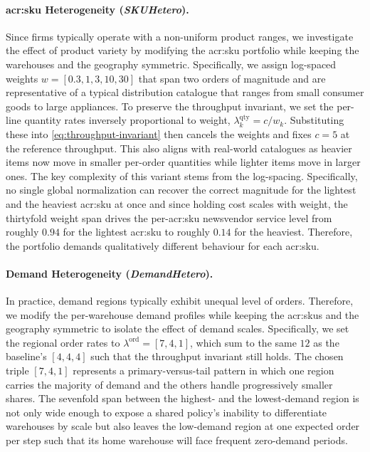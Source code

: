 \paragraph{\textbf{\gls{acr:sku} Heterogeneity} (\textit{SKUHetero}).} Since firms typically operate with a non-uniform product ranges, we investigate the effect of product variety by modifying the \gls{acr:sku} portfolio while keeping the warehouses and the geography symmetric. Specifically, we assign log-spaced weights $w=[0.3,1,3,10,30]$ that span two orders of magnitude and are representative of a typical distribution catalogue that ranges from small consumer goods to large appliances. To preserve the throughput invariant, we set the per-line quantity rates inversely proportional to weight, $\lambda^{\mathrm{qty}}_k=c/w_k$. Substituting these into \autoref{eq:throughput-invariant} then cancels the weights and fixes $c=5$ at the reference throughput. This also aligns with real-world catalogues as heavier items now move in smaller per-order quantities while lighter items move in larger ones. The key complexity of this variant stems from the log-spacing. Specifically, no single global normalization can recover the correct magnitude for the lightest and the heaviest \gls{acr:sku} at once and since holding cost scales with weight, the thirtyfold weight span drives the per-\gls{acr:sku} newsvendor service level from roughly $0.94$ for the lightest \gls{acr:sku} to roughly $0.14$ for the heaviest. Therefore, the portfolio demands qualitatively different behaviour for each \gls{acr:sku}.

\paragraph{\textbf{Demand Heterogeneity} (\textit{DemandHetero}).} In practice, demand regions typically exhibit unequal level of orders. Therefore, we modify the per-warehouse demand profiles while keeping the \glspl{acr:sku} and the geography symmetric to isolate the effect of demand scales. Specifically, we set the regional order rates to $\lambda^{\mathrm{ord}}=[7,4,1]$, which sum to the same $12$ as the baseline's $[4,4,4]$ such that the throughput invariant still holds. The chosen triple $[7,4,1]$ represents a primary-versus-tail pattern in which one region carries the majority of demand and the others handle progressively smaller shares. The sevenfold span between the highest- and the lowest-demand region is not only wide enough to expose a shared policy's inability to differentiate warehouses by scale but also leaves the low-demand region at one expected order per step such that its home warehouse will face frequent zero-demand periods.

